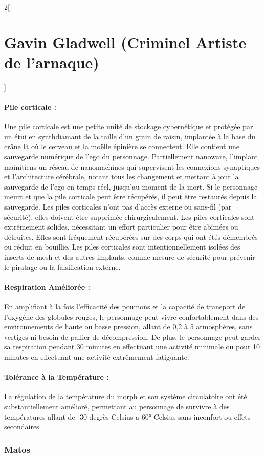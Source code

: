\documentclass[a4paper,9pt]{article}
\begin{document}
\begin{multicols}{2}[\section*{Gavin Gladwell (Criminel Artiste de l'arnaque)}]
\paragraph{Pile corticale :}
Une pile corticale est une petite unité de stockage cybernétique et protégée
par un étui en synthdiamant de la taille d'un grain de raisin, implantée à la
base du crâne là où le cerveau et la moëlle épinière se connectent. Elle
contient une sauvegarde numérique de l'ego du personnage. Partiellement
nanoware, l'implant mainitiens un réseau de nanomachines qui supervisent
les connexions synaptiques et l'architecture cérébrale, notant tous les
changement et mettant à jour la sauvegarde de l'ego en temps réel, jusqu'au
moment de la mort. Si le personnage meurt et que la pile corticale peut être
récupérés, il peut être restaurés depuis la sauvegarde. Les piles corticales
n'ont pas d'accès externe ou sans-fil (par sécurité), elles doivent être
supprimée chirurgicalement. Les piles corticales sont extrêmement solides,
nécessitant un effort particulier pour être abîmées ou détruites. Elles sont
fréquement récupérées sur des corps qui ont étés démembrés ou réduit en
bouillie. Les piles corticales sont intentionnellement isolées des inserts de
mesh et des autres implants, comme mesure de sécurité pour prévenir le piratage
ou la falsification externe.

\paragraph{Respiration Améliorée :} En amplifiant à la fois l'efficacité des
poumons et la capacité de transport de l'oxygène des globules rouges, le
personnage peut vivre confortablement dans des environnements de haute ou
basse pression, allant de 0,2 à 5 atmosphères, sans vertiges ni besoin de
pallier de décompression. De plus, le personnage peut garder sa respiration
pendant 30 minutes en effectuant une activité minimale ou pour 10 minutes en
effectuant une activité extrêmement fatiguante.

\paragraph{Tolérance à la Température :} La régulation de la température du morph
et son système circulatoire ont été substantiellement amélioré, permettant au
personnage de survivre à des températures allant de -30 degrès Celsius a 60°
Celsius sans inconfort ou effets secondaires.

\subsubsection*{Matos}


\end{multicols}
\end{document}
